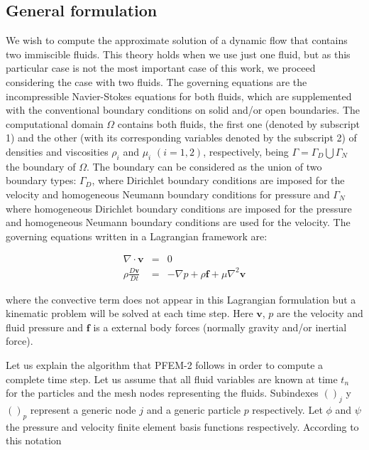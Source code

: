 \subsection{General formulation}\label{GeneralFor}
We wish to compute the approximate solution of a dynamic flow that contains two immiscible fluids. This theory holds when we use just one fluid, but as this particular case is not the most important case of this work, we proceed considering the case with two fluids. The governing equations are the incompressible Navier-Stokes equations for both fluids, which are supplemented with the conventional boundary conditions on solid and/or open boundaries. The computational domain $\Omega$ contains both fluids, the first one (denoted by subscript 1) and the other (with its corresponding variables denoted by the subscript 2) of densities and viscosities $\rho_i$ and $\mu_i$ $(i=1,2)$, respectively, being $\Gamma=\Gamma_D\bigcup\Gamma_N$ the boundary of $\Omega$. The boundary can be considered as the union of two boundary types: $\Gamma_D$, where Dirichlet boundary conditions are imposed for the velocity and homogeneous Neumann boundary conditions for pressure and $\Gamma_N$ where homogeneous Dirichlet boundary conditions are imposed for the pressure and homogeneous Neumann boundary conditions are used for the velocity. The governing equations written in a Lagrangian framework are:

\begin{eqnarray}
  \nabla \cdot \mathbf{v} &=& 0 \\
  \rho\frac{D\mathbf{v}}{Dt} &=& -\nabla p + \rho \mathbf{f}+ \mu \nabla^2 \mathbf{v}
\end{eqnarray}

where the convective term does not appear in this Lagrangian formulation but a kinematic problem will be solved at each time step. Here $\mathbf{v}$, $p$ are the velocity and fluid pressure and $\mathbf{f}$ is a external body forces (normally gravity and/or inertial force).

Let us explain the algorithm that PFEM-2 follows in order to compute a complete time step. Let us assume that all fluid variables are known at time $t_n$ for the particles and the mesh nodes representing the fluids. Subindexes $()_j$ y $()_p$ represent a generic node $j$ and a generic particle $p$ respectively. Let $\phi$ and $\psi$ the pressure and velocity finite element basis functions respectively. According to this notation

